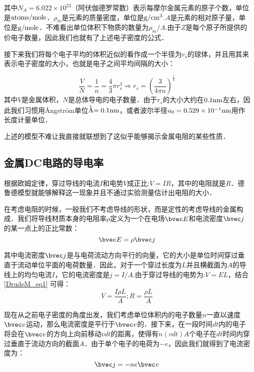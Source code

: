 其中$N_A=6.022\times 10^{23}$（阿伏伽德罗常数）表示每摩尔金属元素的原子个数，单位是$\rm{atoms/mole}$．$\rho_m$是元素的质量密度，单位是$\rm{g/cm^3}$.$A$是元素的相对原子量，单位是$\rm{g/mole}$．不难看出单位体积下物质的数量为$\rho_m/A$.由于$Z$是每个原子所提供的价电子数量，因此我们也就有了上述电子密度的公式．

接下来我们将每个电子平均的体积近似的看作成一个半径为$r_s$的球体，并且用其来表示电子密度的大小，也就是电子之间平均间隔的大小：

\begin{equation}
\frac{V}{N}=\frac{1}{n}=\frac{4}{3}\pi r_s^3 \Rightarrow r_s=\left(\frac{3}{4\pi n}\right)^\frac{1}{3}
\end{equation}
其中$V$是金属体积，$N$是总体导电的电子数量．由于$r_s$的大小大约在$0.1\rm{nm}$左右，因此我们习惯用Ångström单位$\buildrel _{\circ} \over {\mathrm{A}}=0.1\rm{nm}$，或者波尔半径$a_0=0.529\times 10^{-1}\rm{nm}$用作长度计量单位．

上述的模型不难让我直接就联想到了这似乎能够揭示金属电阻的某些性质．

\subsection{金属DC电路的导电率}

根据欧姆定律，穿过导线的电流$I$和电势$V$成正比:$V=IR$，其中的电阻就是$R$．德鲁德模型就能够解释这一现象并且不通过实验测量估计出电阻的大小．

在考虑电阻的时候，一般我们不考虑导线的形状，而是定性的考虑导线的金属构成．我们将导线材质本身的电阻率$\rho$定义为一个在电场$\bvec E$和电流密度$\bvec j$的某一点上的正比常数：
\begin{equation}\label{DrudeM_eq1}
\bvec E =\rho \bvec j
\end{equation}

其中电流密度$\bvec j$是与电荷流动方向平行的向量，它的大小是单位时间穿过垂直于流动单位平面的电荷数量．因此，对于一个穿过长度为$L$并且横截面为$A$的导线上的均匀电流$I$，它的电流密度是$j=I/A$.由于穿过导线的电势为:$V=EL$，结合\autoref{DrudeM_eq1} 可得：
\begin{equation}
V=\frac{I\rho L}{A}; R = \frac{\rho L}{A}
\end{equation}

现在从之前电子密度的角度出发，我们考虑单位体积内的电子数量$n$一直以速度$\bvec v$运动，那么电流密度是平行于$\bvec v$的．接下来，在一段时间$dt$内的电子将会在$\bvec v$的方向上向前移动$v dt$的距离，使得有$n(v dt)A$个电子在$dt$时间内穿过垂直于流动方向的截面$A$．由于单个电子的电荷为$-e$，因此我们就得到了电流密度为：
\begin{equation}\label{DrudeM_eq2}
\bvec j = -ne\bvec v
\end{equation}

